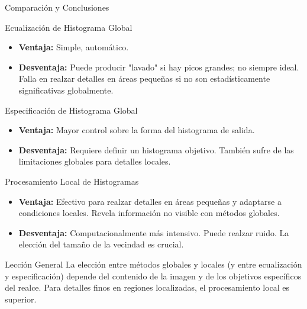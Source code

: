 \documentclass{beamer}
\begin{document}
\begin{frame}{Comparación y Conclusiones}\tiny
    \begin{block}{Ecualización de Histograma Global}
        \begin{itemize}
            \item \textbf{Ventaja:} Simple, automático.
            \item \textbf{Desventaja:} Puede producir "lavado" si hay picos grandes; no siempre ideal. Falla en realzar detalles en áreas pequeñas si no son estadísticamente significativas globalmente.
        \end{itemize}
    \end{block}
    \pause
    \begin{alertblock}{Especificación de Histograma Global}
        \begin{itemize}
            \item \textbf{Ventaja:} Mayor control sobre la forma del histograma de salida.
            \item \textbf{Desventaja:} Requiere definir un histograma objetivo. También sufre de las limitaciones globales para detalles locales.
        \end{itemize}
    \end{alertblock}
    \pause
    \begin{exampleblock}{Procesamiento Local de Histogramas}
        \begin{itemize}
            \item \textbf{Ventaja:} Efectivo para realzar detalles en áreas pequeñas y adaptarse a condiciones locales. Revela información no visible con métodos globales.
            \item \textbf{Desventaja:} Computacionalmente más intensivo. Puede realzar ruido. La elección del tamaño de la vecindad es crucial.
        \end{itemize}
    \end{exampleblock}
     \begin{block}{Lección General}
        La elección entre métodos globales y locales (y entre ecualización y especificación) depende del contenido de la imagen y de los objetivos específicos del realce. Para detalles finos en regiones localizadas, el procesamiento local es superior.
    \end{block}
\end{frame}

\end{document}
